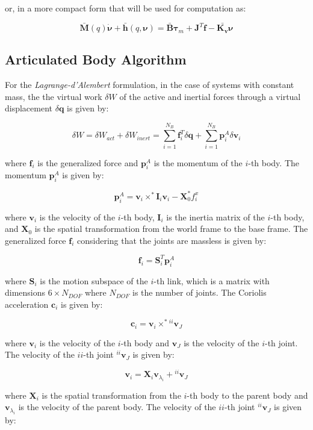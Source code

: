 or, in a more compact form that will be used for computation as:

$$
    \mathbf{\bar{M}}(q)\dot{\boldsymbol{\nu}} + \mathbf{\bar{h}}(q,\boldsymbol{\nu}) = \mathbf{\bar{B}}\boldsymbol{\tau} _m + \mathbf{J} ^T \mathbf{f} - \bar{\mathbf{K _v}}\boldsymbol{\nu}
$$

\subsection{Articulated Body Algorithm}

For the \textit{Lagrange-d'Alembert} formulation, in the case of systems with constant mass, the the virtual work $\delta W$ of the active and inertial forces through a virtual displacement $\delta \mathbf{q}$ is given by:

$$
    \delta W = \delta W _{act} + \delta W _{inert} = \sum _{i = 1} ^{N _B} \mathbf{f} _i ^T \delta \mathbf{q} + \sum _{i = 1} ^{N _B} \mathbf{p} ^A _i \delta \mathbf{v} _i
$$

where $\mathbf{f} _i$ is the generalized force and $\mathbf{p} ^A _i$ is the momentum of the $i$-th body. The momentum $\mathbf{p} ^A _i$ is given by:

$$
    \mathbf{p} ^A _i = \mathbf{v} _i \times ^* \mathbf{I} _i \mathbf{v} _i - \mathbf{X} ^* _0 f ^x _i
$$

where $\mathbf{v} _i$ is the velocity of the $i$-th body, $\mathbf{I} _i$ is the inertia matrix of the $i$-th body, and $\mathbf{X} _0$ is the spatial transformation from the world frame to the base frame. The generalized force $\mathbf{f} _i$ considering that the joints are massless is given by:

$$
    \mathbf{f} _i = \mathbf{S} ^T _i \mathbf{p} ^A _i
$$

where $\mathbf{S} _i$ is the motion subspace of the $i$-th link, which is a matrix with dimensions $6 \times N _{DOF}$ where $N _{DOF}$ is the number of joints. The Coriolis acceleration $\mathbf{c} _i$ is given by:

$$
    \mathbf{c} _i = \mathbf{v} _i \times ^* {} ^{ii}\mathbf{v} _J
$$

where $\mathbf{v} _i$ is the velocity of the $i$-th body and $\mathbf{v} _J$ is the velocity of the $i$-th joint. The velocity of the $ii$-th joint ${} ^{ii}\mathbf{v} _J$ is given by:

$$
    \mathbf{v} _i = \mathbf{X} _i \mathbf{v} _{\lambda _i} + {} ^{ii}\mathbf{v} _J
$$

where $\mathbf{X} _i$ is the spatial transformation from the $i$-th body to the parent body and $\mathbf{v} _{\lambda _i}$ is the velocity of the parent body. The velocity of the $ii$-th joint ${} ^{ii}\mathbf{v} _J$ is given by:

